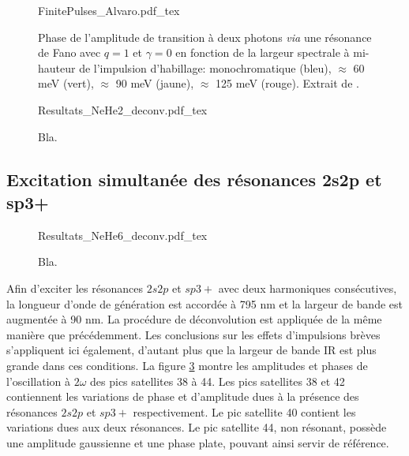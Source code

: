 \begin{figure}
\centering
\def\svgwidth{0.3\textwidth}
{FinitePulses_Alvaro.pdf_tex}
\caption{Phase de l'amplitude de transition à deux photons \textit{via} une résonance de Fano avec $q = 1$ et $\gamma = 0$ en fonction de la largeur spectrale à mi-hauteur de l'impulsion d'habillage: monochromatique (bleu), $\approx$ 60 meV (vert), $\approx$ 90 meV (jaune), $\approx$ 125 meV (rouge). Extrait de .}
\label{fig:FinitePulses_Alvaro}
\end{figure}

\begin{figure} [ht]
\centering
\def\svgwidth{\textwidth}
{Resultats_NeHe2_deconv.pdf_tex}
\caption{Bla.}
\label{fig:Resultats_NeHe2_deconv}
\end{figure}


\subsection{Excitation simultanée des résonances 2s2p et sp3+}
\begin{figure} [ht]
\centering
\def\svgwidth{\textwidth}
{Resultats_NeHe6_deconv.pdf_tex}
\caption{Bla.}
\label{fig:Resultats_NeHe6_deconv}
\end{figure}

Afin d'exciter les résonances $2s2p$ et $sp3+$ avec deux harmoniques consécutives, la longueur d'onde de génération est accordée à 795 nm et la largeur de bande est augmentée à 90 nm. La procédure de déconvolution est appliquée de la même manière que précédemment. Les conclusions sur les effets d'impulsions brèves s'appliquent ici également, d'autant plus que la largeur de bande IR est plus grande dans ces conditions. La figure \ref{fig:Resultats_NeHe6_deconv} montre les amplitudes et phases de l'oscillation à $2\omega$ des pics satellites 38 à 44. Les pics satellites 38 et 42 contiennent les variations de phase et d'amplitude dues à la présence des résonances $2s2p$ et $sp3+$ respectivement. Le pic satellite 40 contient les variations dues aux deux résonances. Le pic satellite 44, non résonant, possède une amplitude gaussienne et une phase plate, pouvant ainsi servir de référence.

